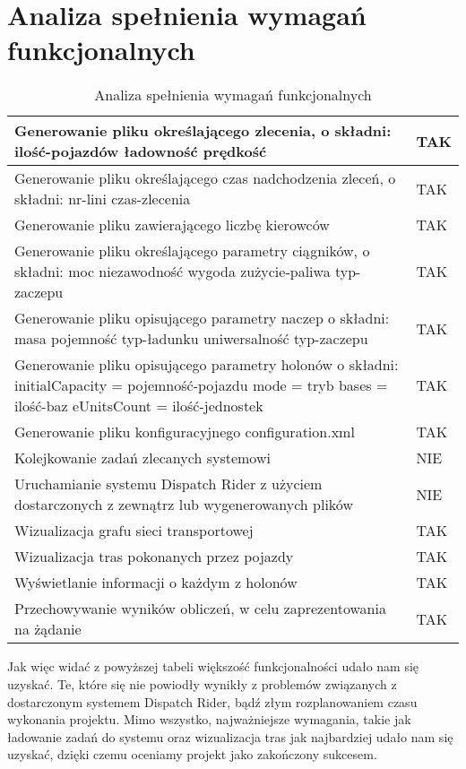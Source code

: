\section{Analiza spełnienia wymagań funkcjonalnych}



\begin{table}[!htbp]
\begin{tabularx}{\textwidth}{ |X|p{2cm}| }
  \hline
  Generowanie pliku określającego zlecenia, o składni: ilość-pojazdów ładowność
prędkość
 & TAK  \\
  \hline
  Generowanie pliku określającego czas nadchodzenia zleceń, o składni: nr-lini czas-zlecenia  & TAK  \\
  \hline
  Generowanie pliku zawierającego liczbę kierowców & TAK \\
  \hline
  Generowanie pliku określającego parametry ciągników, o składni: moc niezawodność wygoda zużycie-paliwa typ-zaczepu & TAK \\
  \hline
  Generowanie pliku opisującego parametry naczep o składni: masa pojemność
typ-ładunku uniwersalność typ-zaczepu & TAK \\
  \hline
  Generowanie pliku opisującego parametry holonów o składni: initialCapacity =
pojemność-pojazdu mode = tryb bases = ilość-baz eUnitsCount = ilość-jednostek & TAK \\
  \hline
  Generowanie pliku konfiguracyjnego configuration.xml & TAK \\
  \hline
  Kolejkowanie zadań zlecanych systemowi & NIE \\
  \hline
  Uruchamianie systemu Dispatch Rider z użyciem dostarczonych z zewnątrz lub wygenerowanych plików & NIE \\
  \hline
  Wizualizacja grafu sieci transportowej & TAK \\
  \hline
  Wizualizacja tras pokonanych przez pojazdy & TAK \\
  \hline
  Wyświetlanie informacji o każdym z holonów & TAK \\
  \hline
  Przechowywanie wyników obliczeń, w celu zaprezentowania na żądanie & TAK \\
  \hline
\end{tabularx}
\caption{Analiza spełnienia wymagań funkcjonalnych}
\end{table}

Jak więc widać z powyższej tabeli większość funkcjonalności udało nam się uzyskać. Te, które się nie powiodły
wynikły z problemów związanych z dostarczonym systemem Dispatch Rider, bądź złym rozplanowaniem czasu wykonania
projektu. Mimo wszystko, najważniejsze wymagania, takie jak ładowanie zadań do systemu oraz wizualizacja tras
jak najbardziej udało nam się uzyskać, dzięki czemu oceniamy projekt jako zakończony sukcesem.

